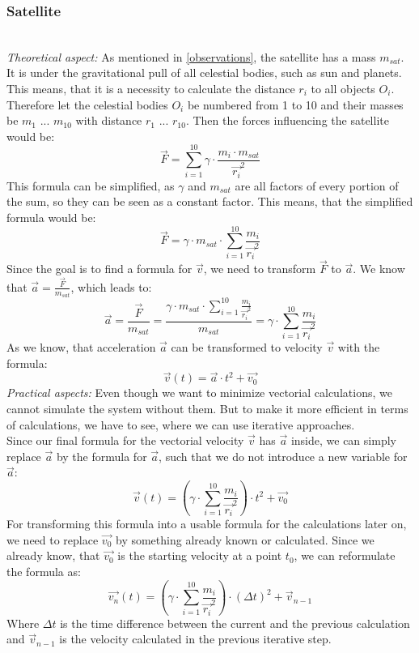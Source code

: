\documentclass[conference,compsoc]{IEEEtran}
\begin{document}
\subsubsection{Satellite}\hfill\\
\label{satellite}
\emph{Theoretical aspect: } As mentioned in \ref{observations}, the satellite has a mass $m_{sat}$. It is under the gravitational pull of all celestial bodies, such as sun and planets. This means, that it is a necessity to calculate the distance $r_{i}$ to all objects $O_{i}$.
Therefore let the celestial bodies $O_{i}$ be numbered from 1 to 10 and their masses be $m_{1}$ ... $m_{10}$ with distance $r_{1}$ ... $r_{10}$. Then the forces influencing the satellite would be:
$$ \vec{F} = \sum_{i=1}^{10}{\gamma \cdot \frac{m_{i} \cdot m_{sat}}{\vec{r_{i}}^{2}}} $$
This formula can be simplified, as $\gamma$ and $m_{sat}$ are all factors of every portion of the sum, so they can be seen as a constant factor. This means, that the simplified formula would be:
$$ \vec{F} = \gamma \cdot m_{sat} \cdot \sum_{i=1}^{10}{\frac{m_{i}}{\vec{r_{i}}^{2}}} $$
Since the goal is to find a formula for $\vec{v}$, we need to transform $\vec{F}$ to $\vec{a}$. We know that $\vec{a} = \frac{\vec{F}}{m_{sat}}$, which leads to:
$$ \vec{a} = \frac{\vec{F}}{m_{sat}} = \frac{\gamma \cdot m_{sat} \cdot \sum_{i=1}^{10}{\frac{m_{i}}{\vec{r_{i}}^{2}}}}{m_{sat}} = \gamma \cdot \sum_{i=1}^{10}{\frac{m_{i}}{\vec{r_{i}}^{2}}} $$
As we know, that acceleration $\vec{a}$ can be transformed to velocity $\vec{v}$ with the formula: 
$$ \vec{v}(t) = \vec{a} \cdot t^{2} + \vec{v_{0}} $$
\emph{Practical aspects: } Even though we want to minimize vectorial calculations, we cannot simulate the system without them. But to make it more efficient in terms of calculations, we have to see, where we can use iterative approaches. \\ 
Since our final formula for the vectorial velocity $\vec{v}$ has $\vec{a}$ inside, we can simply replace $\vec{a}$ by the formula for $\vec{a}$, such that we do not introduce a new variable for $\vec{a}$:
$$ \vec{v}(t) = (\gamma \cdot \sum_{i=1}^{10}{\frac{m_{i}}{\vec{r_{i}}^{2}}}) \cdot t^{2} + \vec{v_{0}} $$
For transforming this formula into a usable formula for the calculations later on, we need to replace $\vec{v_{0}}$ by something already known or calculated. Since we already know, that $\vec{v_{0}}$ is the starting velocity at a point $t_{0}$, we can reformulate the formula as:
$$ \vec{v_{n}}(t) = (\gamma \cdot \sum_{i=1}^{10}{\frac{m_{i}}{\vec{r_{i}}^{2}}}) \cdot (\Delta t)^{2} + \vec{v}_{n-1} $$
Where $ \Delta t$ is the time difference between the current and the previous calculation and $\vec{v}_{n-1}$ is the velocity calculated in the previous iterative step.
\end{document}
